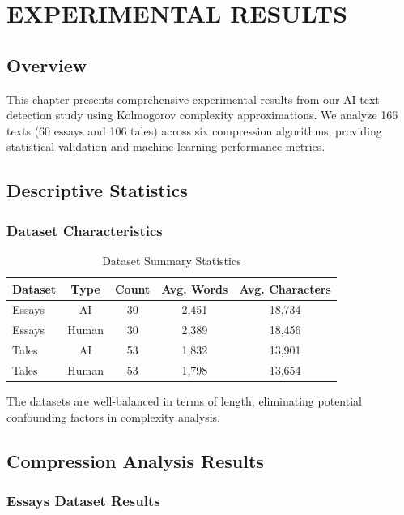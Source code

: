 \documentclass[12pt,a4paper]{report}
\begin{document}
\chapter{EXPERIMENTAL RESULTS}

\section{Overview}

This chapter presents comprehensive experimental results from our AI text detection study using Kolmogorov complexity approximations. We analyze 166 texts (60 essays and 106 tales) across six compression algorithms, providing statistical validation and machine learning performance metrics.

\section{Descriptive Statistics}

\subsection{Dataset Characteristics}

\begin{table}[h]
\centering
\caption{Dataset Summary Statistics}
\begin{tabular}{lcccc}
\toprule
\textbf{Dataset} & \textbf{Type} & \textbf{Count} & \textbf{Avg. Words} & \textbf{Avg. Characters} \\
\midrule
Essays & AI & 30 & 2,451 & 18,734 \\
Essays & Human & 30 & 2,389 & 18,456 \\
Tales & AI & 53 & 1,832 & 13,901 \\
Tales & Human & 53 & 1,798 & 13,654 \\
\bottomrule
\end{tabular}
\end{table}

The datasets are well-balanced in terms of length, eliminating potential confounding factors in complexity analysis.

\section{Compression Analysis Results}

\subsection{Essays Dataset Results}
\end{document}
